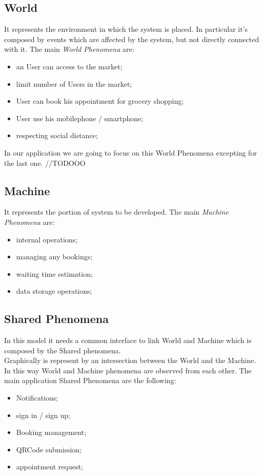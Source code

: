 \subsection{World}

It represents the environment in which the system is placed. In particular it's composed by events which are affected by the system, but not directly connected with it.
The main \textit{World Phenomena} are:

\begin{itemize}
\item an User can access to the market;
\item limit number of Users in the market;
\item User can book his appointment for grocery shopping;
\item User use his mobilephone / smartphone;
\item respecting social distance;
\end{itemize}

In our application we are going to focus on this World Phenomena excepting for the last one. //TODOOO

\subsection{Machine}
It represents the portion of system to be developed.
The main \textit{Machine Phenomena} are:
\begin{itemize}
\item internal operations;
\item managing any bookings;
\item waiting time estimation;
\item data storage operations;
\end{itemize}
\subsection{Shared Phenomena} 
In this model it needs a common interface to link World and Machine which is composed by the Shared phenomena. \\
Graphically is represent by an intersection between the World and the Machine. In this way World and Machine phenomena are observed from each other.  
The main application Shared Phenomena are the following:

\begin{itemize}
\item Notifications;
\item sign in / sign up;
\item Booking management;
\item QRCode submission;
\item appointment request;
\end{itemize}

